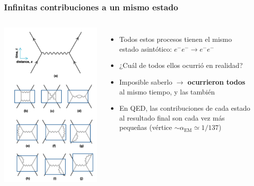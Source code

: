 \documentclass[xetex,mathserif,serif,10pt]{beamer}
\begin{document}
\begin{frame}
  \frametitle{Infinitas contribuciones a un mismo estado}
  \begin{columns}
    {\centering\includegraphics[width=1.0\columnwidth]{./figs/u01/qed-4vertex.png}}
    \begin{itemize}
      \item Todos estos procesos tienen el mismo estado asintótico: $e^- e^- \to e^- e^-$
      \item ¿Cuál de todos ellos ocurrió en realidad?
      \item Imposible saberlo $\rightarrow$ {\bf{\alert{ocurrieron todos}}} al mismo tiempo, y las {\bf{\color{chart09}{infinitas posibles combinaciones}}} también
      \item En QED, las contribuciones de cada estado al resultado final son cada vez más pequeñas (vértice $\sim \alpha_{\mathrm{EM}} \simeq 1/137$)
    \end{itemize}
  \end{columns}
\end{frame}
\end{document}
